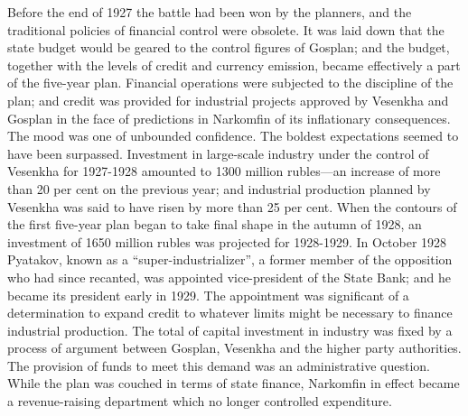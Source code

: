 Before the end of 1927 the battle had been won by the planners, and the traditional policies of financial control were obsolete. It was laid down that the state budget would be geared to the control figures of Gosplan; and the budget, together with the levels of credit and currency emission, became effectively a part of the five-year plan. Financial operations were subjected to the discipline of the plan; and credit was provided for industrial projects approved by Vesenkha and Gosplan in the face of predictions in Narkomfin of its inflationary consequences. The mood was one of unbounded confidence. The boldest expectations seemed to have been surpassed. Investment in large-scale industry under the control of Vesenkha for 1927-1928 amounted to 1300 million rubles---an increase of more than 20 per cent on the previous year; and industrial production planned by Vesenkha was said to have risen by more than 25 per cent. When the contours of the first five-year plan began to take final shape in the autumn of 1928, an investment of 1650 million rubles was projected for 1928-1929. In October 1928 Pyatakov, known as a ``super-industrializer'', a former member of the opposition who had since recanted, was appointed vice-president of the State Bank; and he became its president early in 1929. The appointment was significant of a determination to expand credit to whatever limits might be necessary to finance industrial production. The total of capital investment in industry was fixed by a process of argument between Gosplan, Vesenkha and the higher party authorities. The provision of funds to meet this demand was an administrative question. While the plan was couched in terms of state finance, Narkomfin in effect became a revenue-raising department which no longer controlled expenditure. 

